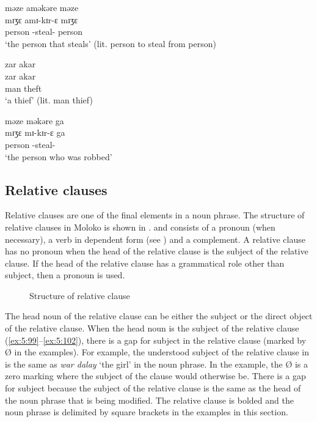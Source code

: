 \ea \label{ex:5:96}
məze aməkəre  məze \\
\gll  mɪʒɛ amɪ-kɪr-ɛ mɪʒɛ \\
      person  {\DEP}-steal-{\CL}  person\\
\glt ‘the person that steals’ (lit. person to steal from person)
\z

\ea \label{ex:5:97}
zar  akar\\
\gll  zar    akar\\
      man    theft  \\
\glt ‘a thief’ (lit. man thief)
\z

\ea \label{ex:5:98} 
məze məkəre  ga \\
\gll mɪʒɛ mɪ-kɪr-ɛ ga \\
person  {\NOM}{}-steal-{\CL}  {\ADJ}\\
\glt ‘the person who was robbed’ 
\z{}

\subsection{Relative clauses}\label{sec:5.4.3}
\hypertarget{RefHeading1211781525720847}{}
Relative clauses are one of the final elements in a noun phrase. The structure of relative clauses in Moloko is shown in . and consists of a pronoun (when necessary), a verb in dependent form (see ) and a complement. A relative clause has no pronoun when the head of the relative clause  is the subject of the relative clause. If the head of the relative clause has a grammatical role other than subject, then a pronoun is used.

\begin{figure}
\caption{\label{fig:9} Structure of relative clause}
\end{figure}

The head noun of the relative clause can be either the subject or  the direct object of the relative clause. When the head noun is the subject of the relative clause (\ref{ex:5:99}--\ref{ex:5:102}), there is a gap for subject in the relative clause (marked by Ø in the examples). For example, the understood subject of the relative clause in  is the same as \textit{war dalay} ‘the girl’ in the noun phrase. In the example, the Ø is a zero marking where the subject of the clause would otherwise be. There is a gap for subject because the subject of the relative clause is the same as the head of the noun phrase that is being modified. The relative clause is bolded and the noun phrase is delimited by square brackets in the examples in this section.

